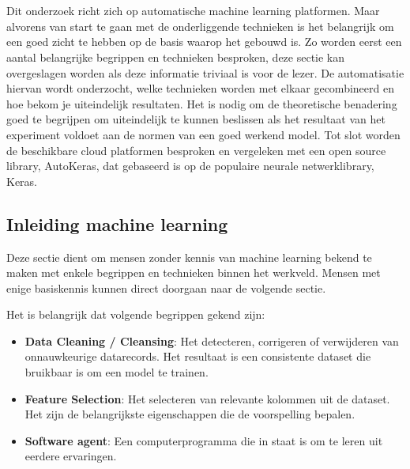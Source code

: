 \chapter{}
\label{ch:stand-van-zaken}



Dit onderzoek richt zich op automatische machine learning platformen. Maar alvorens van start te gaan met de onderliggende technieken is het belangrijk om een goed zicht te hebben op de basis waarop het gebouwd is. Zo worden eerst een aantal belangrijke begrippen en technieken besproken, deze sectie kan overgeslagen worden als deze informatie triviaal is voor de lezer. De automatisatie hiervan wordt onderzocht, welke technieken worden met elkaar gecombineerd en hoe bekom je uiteindelijk resultaten. Het is nodig om de theoretische benadering goed te begrijpen om uiteindelijk te kunnen beslissen als het resultaat van het experiment voldoet aan de normen van een goed werkend model. Tot slot worden de beschikbare cloud platformen besproken en vergeleken met een open source library, AutoKeras, dat gebaseerd is op de populaire neurale netwerklibrary, Keras. 

\section{Inleiding machine learning}
\label{sec:inl-machine-learning}

Deze sectie dient om mensen zonder kennis van machine learning bekend te maken met enkele begrippen en technieken binnen het werkveld. Mensen met enige basiskennis kunnen direct doorgaan naar de volgende sectie.

Het is belangrijk dat volgende begrippen gekend zijn:
\begin{itemize}
    \item \textbf{Data Cleaning / Cleansing}: Het detecteren, corrigeren of verwijderen van onnauwkeurige datarecords. Het resultaat is een consistente dataset die bruikbaar is om een model te trainen.
    \item \textbf{Feature Selection}: Het selecteren van relevante kolommen uit de dataset. Het zijn de belangrijkste eigenschappen die de voorspelling bepalen.
    \item \textbf{Software agent}: Een computerprogramma die in staat is om te leren uit eerdere ervaringen.
\end{itemize}

